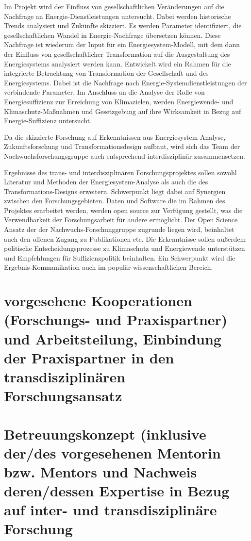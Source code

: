 \documentclass[a4paper,11pt,twoside]{scrartcl}
\begin{document}
Im Projekt wird der Einfluss von gesellschaftlichen Veränderungen auf die Nachfrage an Energie-Dienstleistungen untersucht. Dabei werden historische Trends analysiert und Zukünfte skizziert. Es werden Parameter identifiziert, die gesellschaftlichen Wandel in Energie-Nachfrage übersetzen können. Diese Nachfrage ist wiederum der Input für ein Energiesystem-Modell, mit dem dann der Einfluss von gesellschaftlicher Transformation auf die Ausgestaltung des Energiesystems analysiert werden kann.
Entwickelt wird ein Rahmen für die integrierte Betrachtung von Transformation der Gesellschaft und des Energiesystems. Dabei ist die Nachfrage nach Energie-Systemdienstleistungen der verbindende Parameter. Im Anschluss an die Analyse der Rolle von Energiesuffizienz zur Erreichung von Klimazielen, werden Energiewende- und Klimaschutz-Maßnahmen und Gesetzgebung auf ihre Wirksamkeit in Bezug auf Energie-Suffizienz untersucht.

Da die skizzierte Forschung auf Erkenntnissen aus Energiesystem-Analyse, Zukunftsforschung und Transformationsdesign aufbaut, wird sich das Team der Nachwuchsforschungsgruppe auch entsprechend interdisziplinär zusammensetzen.

Ergebnisse des trans- und interdisziplinären Forschungsprojektes sollen sowohl Literatur und Methoden der Energiesystem-Analyse als auch die des Transformations-Designs erweitern. Schwerpunkt liegt dabei auf Synergien zwischen den Forschungsgebieten. Daten und Software die im Rahmen des Projektes erarbeitet werden, werden open source zur Verfügung gestellt, was die Verwendbarkeit der Forschungsarbeit für andere ermöglicht. Der Open Science Ansatz der der Nachwuchs-Forschunggruppe zugrunde liegen wird, beinhaltet auch den offenen Zugang zu Publikationen etc. Die Erkenntnisse sollen außerdem politische Entscheidungsprozesse zu Klimaschutz und Energiewende unterstützen und Empfehlungen für Suffizienzpolitik beinhalten. Ein Schwerpunkt wird die Ergebnis-Kommunikation auch im populär-wissenschaftlichen Bereich.


\section{vorgesehene Kooperationen (Forschungs- und Praxispartner) und Arbeitsteilung, Einbindung der Praxispartner in den transdisziplinären Forschungsansatz}

\section{Betreuungskonzept (inklusive der/des vorgesehenen Mentorin bzw. Mentors und Nachweis deren/dessen Expertise in Bezug auf inter- und transdisziplinäre Forschung}
\end{document}
